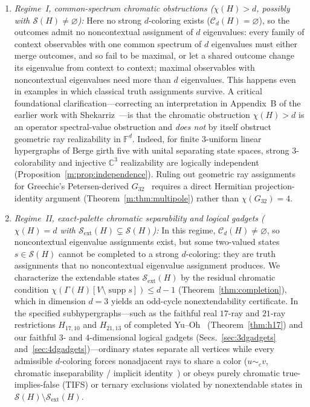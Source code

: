 \documentclass[aps,pra,reprint,superscriptaddress,longbibliography,nofootinbib,floatfix,10pt]{revtex4-2}
\theoremstyle{definition}\newtheorem{definition}[theorem]{Definition}
\theoremstyle{remark}\newtheorem{remark}[theorem]{Remark}
\newcommand{\C}{\mathbb C}\newcommand{\R}{\mathbb R}\newcommand{\Q}{\mathbb Q}
\newcommand{\F}{\mathbb F}\newcommand{\Z}{\mathbb Z}\newcommand{\PP}{\mathbb P}
\DeclareMathOperator{\supp}{supp}\DeclareMathOperator{\conv}{conv}
\begin{document}
\begin{enumerate}
\item \emph{Regime~I, common-spectrum chromatic obstructions ($\chi(H)>d$, possibly with $\mathcal S(H)\ne\varnothing$):} Here no strong $d$-coloring exists ($\mathcal C_d(H)=\varnothing$), so the outcomes admit no noncontextual assignment of $d$ eigenvalues: every family of context observables with one common spectrum of $d$ eigenvalues must either merge outcomes, and so fail to be maximal, or let a shared outcome change its eigenvalue from context to context; maximal observables with noncontextual eigenvalues need more than $d$ eigenvalues. This happens even in examples in which classical truth assignments survive. A critical foundational clarification—correcting an interpretation in Appendix~B of the earlier work with Shekarriz~\cite{svozil-2021-chroma}—is that the chromatic obstruction $\chi(H)>d$ is an operator spectral-value obstruction and \emph{does not} by itself obstruct geometric ray realizability in $\F^d$. Indeed, for finite $3$-uniform linear hypergraphs of Berge girth five with unital separating state spaces, strong $3$-colorability and injective $\C^3$ realizability are logically independent (Proposition~\ref{m:prop:independence}). Ruling out geometric ray assignments for Greechie's Petersen-derived $G_{32}$~\cite{greechie:71} requires a direct Hermitian projection-identity argument (Theorem~\ref{m:thm:multipole}) rather than $\chi(G_{32})=4$.
\item \emph{Regime~II, exact-palette chromatic separability and logical gadgets ($\chi(H)=d$ with $\mathcal S_{\mathrm{ext}}(H)\subsetneq\mathcal S(H)$):} In this regime, $\mathcal C_d(H)\ne\varnothing$, so noncontextual eigenvalue assignments exist, but some two-valued states $s\in\mathcal S(H)$ cannot be completed to a strong $d$-coloring: they are truth assignments that no noncontextual eigenvalue assignment produces. We characterize the extendable states $\mathcal S_{\mathrm{ext}}(H)$ by the residual chromatic condition $\chi(\Gamma(H)[V\setminus\supp s])\le d-1$ (Theorem~\ref{thm:completion}), which in dimension $d=3$ yields an odd-cycle nonextendability certificate. In the specified subhypergraphs—such as the faithful real $17$-ray and $21$-ray restrictions $H_{17,10}$ and $H_{21,13}$ of completed Yu--Oh~\cite{Yu-2012,svozil-2025-color} (Theorem~\ref{thm:h17}) and our faithful $3$- and $4$-dimensional logical gadgets (Secs.~\ref{sec:3dgadgets} and~\ref{sec:4dgadgets})—ordinary states separate all vertices while every admissible $d$-coloring forces nonadjacent rays to share a color ($u\sim_c v$, chromatic inseparability / implicit identity~\cite{martin2009}) or obeys purely chromatic true-implies-false (TIFS) or ternary exclusions violated by nonextendable states in $\mathcal S(H)\setminus\mathcal S_{\mathrm{ext}}(H)$.
\end{enumerate}
\end{document}

